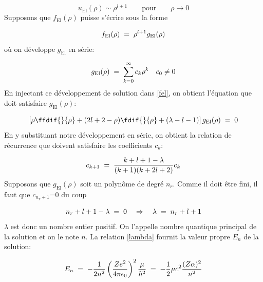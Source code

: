 \[
    u_\text{El}(\rho) \sim \rho^{l+1} \qquad \text{pour} \qquad \rho \longrightarrow 0
\]
Supposons que $f_\text{El}(\rho)$ puisse s'écrire sous la forme

\[
    f_\text{El}(\rho)\; = \;\rho^{l+1}g_\text{El}(\rho)
\]
où on développe $g_\text{El}$ en série:

\[
    g_\text{El}(\rho)\; = \;\sum_{k=0}^{\infty} c_k\rho^k \quad c_0 \neq 0
\]
En injectant ce développement de solution dans \eqref{fel}, on obtient l'équation que doit satisfaire $g_\text{El}(\rho)$:

\begin{equation}
    \left[\rho\ffdif{}{\rho}+(2l+2-\rho)\fdif{}{\rho}+(\lambda-l-1)\right]g_\text{El}(\rho)\eq0
    \label{gel}
\end{equation}
En y substituant notre développement en série, on obtient la relation de récurrence que doivent satisfaire les coefficients $c_k$:

\begin{equation}
    c_{k+1}\; = \;\dfrac{k+l+1-\lambda}{(k+1)(k+2l+2)}c_k
\end{equation}
Supposons que $g_\text{El}(\rho)$ soit un polynôme de degré $n_r$. Comme il doit être fini, il faut que $c_{n_{r}+1}$=0 du coup

\[
    n_r+l+1-\lambda\; = \;0 \quad \Rightarrow \quad \lambda\; = \; n_r +l+1
\]
$\lambda$ est donc un nombre entier positif. On l'appelle nombre quantique principal de la solution et on le note $n$. La relation \eqref{lambda} fournit la valeur propre $E_n$ de la solution:

\begin{equation}
    E_n\; = \; -\dfrac{1}{2n^2}\left(\dfrac{Ze^2}{4\pi\epsilon_0}\right)^2\dfrac{\mu}{\hbar^2}\; = \; -\dfrac{1}{2}\mu c^2 \dfrac{(Z\alpha)^2}{n^2}
\end{equation}

